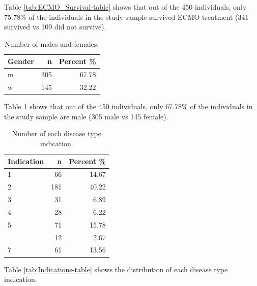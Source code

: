 \documentclass[12pt,]{article}
\begin{document}
Table \ref{tab:ECMO_Survival-table} shows that out of the 450
individuals, only 75.78\% of the individuals in the study sample
survived ECMO treatment (341 survived vs 109 did not survive).

\begin{table}[!h]

\caption{\label{tab:unnamed-chunk-2}\label{tab:Gender-table} Number of males and females.}
\centering
\fontsize{10}{12}\selectfont
\begin{tabular}{lrr}
\toprule
Gender & n & Percent \%\\
\midrule
m & 305 & 67.78\\
w & 145 & 32.22\\
\bottomrule
\end{tabular}
\end{table}

Table \ref{tab:Gender-table} shows that out of the 450 individuals, only
67.78\% of the individuals in the study sample are male (305 male vs 145
female).

\begin{table}[!h]

\caption{\label{tab:Indications-table}\label{tab:sum3} Number of each disease type indication.}
\centering
\fontsize{10}{12}\selectfont
\begin{tabular}{lrr}
\toprule
Indication & n & Percent \%\\
\midrule
1 & 66 & 14.67\\
2 & 181 & 40.22\\
3 & 31 & 6.89\\
4 & 28 & 6.22\\
5 & 71 & 15.78\\
\addlinespace
6 & 12 & 2.67\\
7 & 61 & 13.56\\
\bottomrule
\end{tabular}
\end{table}

Table \ref{tab:Indications-table} shows the distribution of each disease
type indication.
\end{document}
